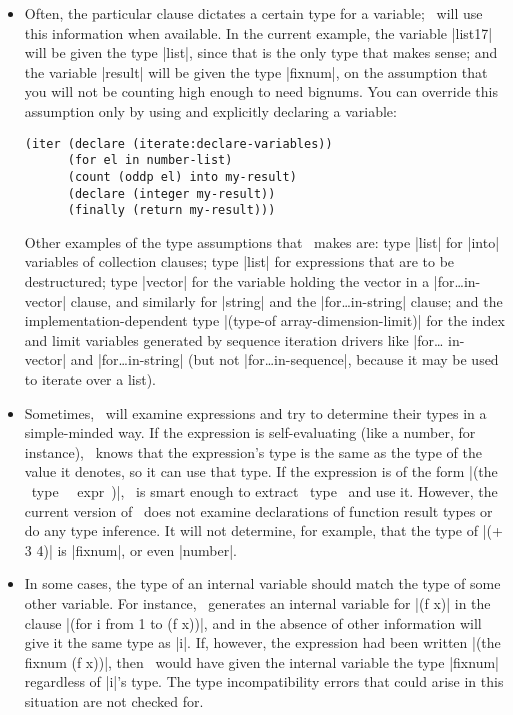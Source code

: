 \begin{itemize}

\item Often, the particular clause dictates a certain type for a
variable; \iter\ will use this information when available.  In the
current example, the variable |list17| will be given the type
|list|, since that is the only type that makes sense; and the
variable |result| will be given the type |fixnum|, on the
assumption that you will not be counting high enough to need bignums.
You can override this assumption only by using and explicitly declaring a
variable:
\begin{verbatim}
(iter (declare (iterate:declare-variables))
      (for el in number-list)
      (count (oddp el) into my-result)
      (declare (integer my-result))
      (finally (return my-result)))
\end{verbatim}

\begin{sloppypar}
Other examples of the type assumptions that \iter\ makes are: type
|list| for |into| variables of collection clauses; type |list| for
expressions that are to be destructured; type |vector| for the
variable holding the vector in a |for\dots in-vector| clause, and
similarly for |string| and the |for\dots in-string| clause;
and the implementation-dependent type
|(type-of array-dimension-limit)| for the index and limit
variables generated by sequence iteration drivers like |for\dots
in-vector| and |for\dots in-string| (but not |for\dots in-sequence|,
because it may be used to iterate over a list).
\end{sloppypar}

\item Sometimes, \iter\ will examine expressions and try to determine
their types in a simple-minded way.  If the expression is
self-evaluating (like a number, for instance), \iter\ knows that the
expression's type is the same as the type of the value it denotes, so
it can use that type.  If the expression is of the form |(the ~type~
~expr~)|, \iter\ is smart enough to extract ~type~ and use it.
However, the current version of \iter\ does not
examine declarations of function result types or do any type
inference.  It will not determine, for
example, that the type of |(+ 3 4)| is |fixnum|, or even
|number|.

\item In some cases, the type of an internal variable should match the
type of some other variable.  For instance, \iter\ generates an
internal variable for |(f x)| in the
clause |(for i from 1 to (f x))|, and in the absence of other
information will give it the same type as |i|.  If, however, the
expression had been written |(the fixnum (f x))|, then \iter\
would have given the internal variable the type |fixnum|
regardless of |i|'s type.  The type incompatibility errors that
could arise in this situation are not checked for.

\end{itemize}

